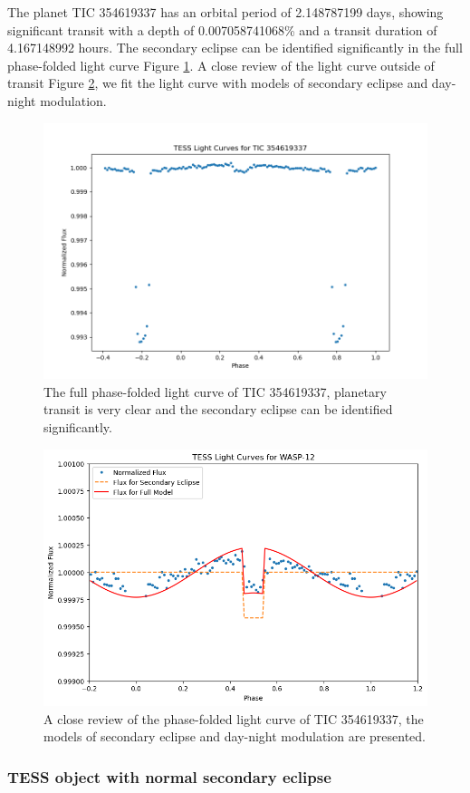 \documentclass{article}
\begin{document}
The planet TIC 354619337 has an orbital period of 2.148787199 days, showing significant transit with a depth of 0.007058741068\% and a transit duration of 4.167148992 hours. The secondary eclipse can be identified significantly in the full phase-folded light curve Figure \ref{fig:354619337_folded}. A close review of the light curve outside of transit Figure \ref{fig:354619337}, we fit the light curve with models of secondary eclipse and day-night modulation.\begin{figure}[H]\centering\includegraphics[width=0.7\linewidth]{image/354619337_folded.png}
\captionsetup{font=small} 
\caption{The full phase-folded light curve of TIC 354619337, planetary transit is very clear and the secondary eclipse can be identified significantly.}\label{fig:354619337_folded}\end{figure}\begin{figure}[H]\centering\includegraphics[width=0.65\linewidth]{image/354619337.png}\captionsetup{font=small} \caption{A close review of the phase-folded light curve of TIC 354619337, the models of secondary eclipse and day-night modulation are presented.}\label{fig:354619337}\end{figure}
\newpage
\subsubsection{TESS object with normal secondary eclipse}
\end{document}
